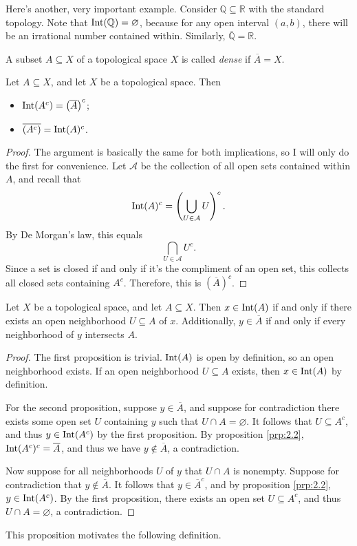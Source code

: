 Here's another, very important example. Consider $\mathbb{Q} \subseteq \mathbb{R} $ with the standard topology. Note that $\operatorname{Int}(\mathbb{Q} )=\varnothing $, because for any open interval $(a,b)$, there will be an irrational number contained within. Similarly, $\overline{\mathbb{Q} } =\mathbb{R}  $.
\begin{definition}[Dense]\label{dfn:2.3}
	A subset $A\subseteq X$ of a topological space $X$ is called \emph{dense} if $\overline{A} =X$.
\end{definition}
\begin{proposition}\label{prp:2.2}
	Let $A\subseteq X$, and let $X$ be a topological space. Then
	\begin{itemize}
		\item $\operatorname{Int}(A^{c} )=\left( \overline{A}  \right) ^{c} $;
		\item $\overline{\left( A^{c}  \right) } =\operatorname{Int}(A)^{c} $.
	\end{itemize}
\end{proposition}
\begin{proof}
	The argument is basically the same for both implications, so I will only do the first for convenience. Let $\mathcal{A} $ be the collection of all open sets contained within $A$, and recall that
	\[
		\operatorname{Int}(A)^{c} =\left( \bigcup_{U\in \mathcal{A} } U \right) ^{c} 
	.\]
	By De Morgan's law, this equals
	\[
		\bigcap_{U\in \mathcal{A} } U^{c} 
	.\]
	Since a set is closed if and only if it's the compliment of an open set, this collects all closed sets containing $A^{c} $. Therefore, this is $\left( \overline{A}  \right) ^{c} $.
\end{proof}
\begin{proposition}\label{prp:2.3}
	Let $X$ be a topological space, and let $A\subseteq X$. Then $x\in \operatorname{Int}(A)$ if and only if there exists an open neighborhood $U\subseteq A$ of $x$. Additionally, $y\in \overline{A} $ if and only if every neighborhood of $y$ intersects $A$.
\end{proposition}
\begin{proof}
	The first proposition is trivial. $\operatorname{Int}(A)$ is open by definition, so an open neighborhood exists. If an open neighborhood $U\subseteq A$ exists, then $x\in \operatorname{Int}(A)$ by definition.

	For the second proposition, suppose $y\in \overline{A} $, and suppose for contradiction there exists some open set $U$ containing $y$ such that $U \cap A=\varnothing $. It follows that $U\subseteq A^{c} $, and thus $y\in \operatorname{Int}(A^{c} )$ by the first proposition. By proposition \ref{prp:2.2}, $\operatorname{Int}(A^{c} )^{c} =\overline{A} $, and thus we have $y\notin \overline{A} $, a contradiction.

	Now suppose for all neighborhoods $U$ of $y$ that $U \cap A$ is nonempty. Suppose for contradiction that $y\notin \overline{A} $. It follows that $y\in \overline{A} ^{c} $, and by proposition \ref{prp:2.2}, $y\in \operatorname{Int}(A^{c} ) $. By the first proposition, there exists an open set $U\subseteq A^{c} $, and thus $U \cap A=\varnothing $, a contradiction.
\end{proof}
This proposition motivates the following definition.
